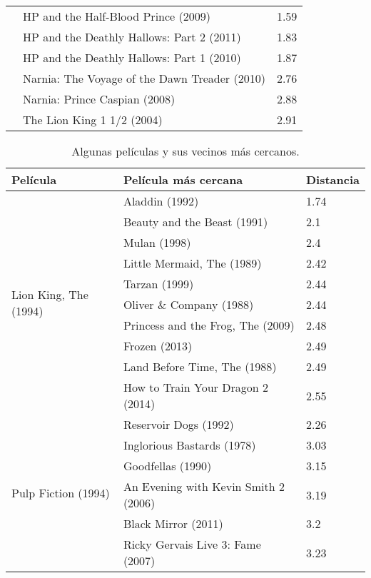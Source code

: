 \begin{table}[H]
\begin{tabular}{ |l|l|l| }
		 &  HP and the Half-Blood Prince (2009)  &  1.59  \\
		 &  HP and the Deathly Hallows: Part 2 (2011)  &  1.83  \\
		 &  HP and the Deathly Hallows: Part 1 (2010)  &  1.87  \\
		 &  Narnia: The Voyage of the Dawn Treader (2010)  &  2.76  \\
		 &  Narnia: Prince Caspian (2008)  &  2.88  \\
		 &  The Lion King 1 1/2 (2004)  &  2.91  \\
		\hline
	\end{tabular}
\end{table}


\begin{table}[H]
	\centering
	\caption{Algunas películas y sus vecinos más cercanos.}
	\label{tab:ML_vecinos_cercanos_2}
	\begin{tabular}{ |l|l|l| }
		\hline
		\textbf{Película} & \textbf{Película más cercana} & \textbf{Distancia} \\ \hline
		\multirow{10}{*}{ Lion King, The (1994) } &  Aladdin (1992)  &  1.74  \\
		 &  Beauty and the Beast (1991)  &  2.1  \\
		 &  Mulan (1998)  &  2.4  \\
		 &  Little Mermaid, The (1989)  &  2.42  \\
		 &  Tarzan (1999)  &  2.44  \\
		 &  Oliver \& Company (1988)  &  2.44  \\
		 &  Princess and the Frog, The (2009)  &  2.48  \\
		 &  Frozen (2013)  &  2.49  \\
		 &  Land Before Time, The (1988)  &  2.49  \\
		 &  How to Train Your Dragon 2 (2014)  &  2.55  \\
		\hline
		\multirow{10}{*}{ Pulp Fiction (1994) } &  Reservoir Dogs (1992)  &  2.26  \\
		 &  Inglorious Bastards (1978)  &  3.03  \\
		 &  Goodfellas (1990)  &  3.15  \\
		 &  An Evening with Kevin Smith 2 (2006)  &  3.19  \\
		 &  Black Mirror (2011)  &  3.2  \\
		 &  Ricky Gervais Live 3: Fame (2007)  &  3.23  \\

\end{tabular}
\end{table}
